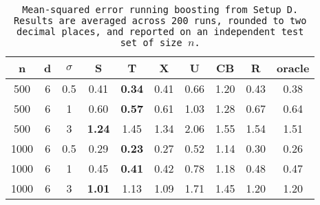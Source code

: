 \begin{table}[ht]
\centering
\begin{tabular}{cccccccccc}
  \hline
n & d & $\sigma$ & S & T & X & U & CB & R & oracle \\ 
  \hline
500 & 6 & 0.5 & 0.41 & \bf 0.34 & 0.41 & 0.66 & 1.20 & 0.43 & 0.38 \\ 
  500 & 6 & 1 & 0.60 & \bf 0.57 & 0.61 & 1.03 & 1.28 & 0.67 & 0.64 \\ 
  500 & 6 & 3 & \bf 1.24 & 1.45 & 1.34 & 2.06 & 1.55 & 1.54 & 1.51 \\ 
  1000 & 6 & 0.5 & 0.29 & \bf 0.23 & 0.27 & 0.52 & 1.14 & 0.30 & 0.26 \\ 
  1000 & 6 & 1 & 0.45 & \bf 0.41 & 0.42 & 0.78 & 1.18 & 0.48 & 0.47 \\ 
  1000 & 6 & 3 & \bf 1.01 & 1.13 & 1.09 & 1.71 & 1.45 & 1.20 & 1.20 \\ 
   \hline
\end{tabular}
\caption{\tt Mean-squared error running \texttt{boosting} from Setup D. Results are averaged across 200 runs, rounded to two decimal places, and reported on an independent test set of size $n$.} 
\label{table:setup4}
\end{table}
